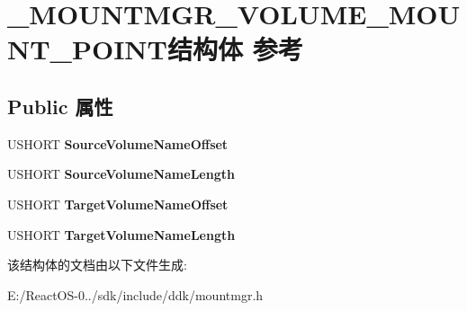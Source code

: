 \hypertarget{struct___m_o_u_n_t_m_g_r___v_o_l_u_m_e___m_o_u_n_t___p_o_i_n_t}{}\section{\+\_\+\+M\+O\+U\+N\+T\+M\+G\+R\+\_\+\+V\+O\+L\+U\+M\+E\+\_\+\+M\+O\+U\+N\+T\+\_\+\+P\+O\+I\+N\+T结构体 参考}
\label{struct___m_o_u_n_t_m_g_r___v_o_l_u_m_e___m_o_u_n_t___p_o_i_n_t}
\subsection*{Public 属性}
\begin{DoxyCompactItemize}
\item 
\mbox{\label{struct___m_o_u_n_t_m_g_r___v_o_l_u_m_e___m_o_u_n_t___p_o_i_n_t_a16861580baf7a7572fcc02da8d92a28d}} 
U\+S\+H\+O\+RT {\bfseries Source\+Volume\+Name\+Offset}
\item 
\mbox{\label{struct___m_o_u_n_t_m_g_r___v_o_l_u_m_e___m_o_u_n_t___p_o_i_n_t_af5b6f91e62eef40da7f44490e4eba5f6}} 
U\+S\+H\+O\+RT {\bfseries Source\+Volume\+Name\+Length}
\item 
\mbox{\label{struct___m_o_u_n_t_m_g_r___v_o_l_u_m_e___m_o_u_n_t___p_o_i_n_t_a35f3e23672579380f82c0b1d660332d9}} 
U\+S\+H\+O\+RT {\bfseries Target\+Volume\+Name\+Offset}
\item 
\mbox{\label{struct___m_o_u_n_t_m_g_r___v_o_l_u_m_e___m_o_u_n_t___p_o_i_n_t_a172a4a2893106948989ea6d3209f22b3}} 
U\+S\+H\+O\+RT {\bfseries Target\+Volume\+Name\+Length}
\end{DoxyCompactItemize}


该结构体的文档由以下文件生成\+:\begin{DoxyCompactItemize}
\item 
E\+:/\+React\+O\+S-\/0../sdk/include/ddk/mountmgr.\+h\end{DoxyCompactItemize}
